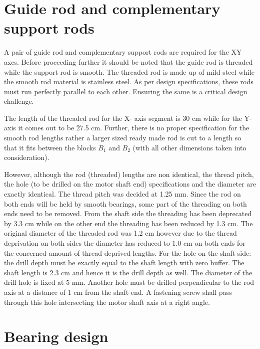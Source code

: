 \section{Guide rod and complementary support rods}

A pair of guide rod and complementary support rods are required for the XY axes. Before proceeding further it should be noted that the guide rod is threaded while the support rod is smooth. The threaded rod is made up of mild steel while the smooth rod material is stainless steel. As per design specifications, these rods must run perfectly parallel to each other. Ensuring the same is a critical design challenge. \par

The length of the threaded rod for the X- axis segment is 30 cm while for the Y- axis it comes out to be 27.5 cm. Further, there is no proper specification for the smooth rod lengths rather a larger sized ready made rod is cut to a length so that it fits between the blocks $B_{1}$ and $B_{2}$ (with all other dimensions taken into consideration). \par

However, although the rod (threaded) lengths are non identical, the thread pitch, the hole (to be drilled on the motor shaft end) specifications and the diameter are exactly identical. The thread pitch was decided at 1.25 mm. Since the rod on both ends will be held by smooth bearings, some part of the threading on both ends need to be removed. From the shaft side the threading has been deprecated by 3.3 cm while on the other end the threading has been reduced by 1.3 cm. The original diameter of the threaded rod was 1.2 cm however due to the thread deprivation on both sides the diameter has reduced to 1.0 cm on both ends for the concerned amount of thread deprived lengths. For the hole on the shaft side: the drill depth must be exactly equal to the shaft length with zero buffer. The shaft length is 2.3 cm and hence it is the drill depth as well. The diameter of the drill hole is fixed at 5 mm. Another hole must be drilled perpendicular to the rod axis at a distance of 1 cm from the shaft end. A fastening screw shall pass through this hole intersecting the motor shaft axis at a right angle.



\section{Bearing design}

